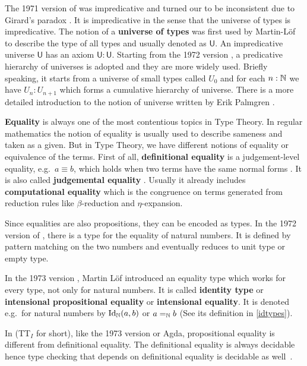 The 1971 version  of \mltt \cite{per:71} was impredicative and turned our to be inconsistent due to Girard's paradox \cite{hurkens1995simplification}. It is impredicative in the sense that the universe of types is impredicative. The notion of a \textbf{universe of types} was first used by Martin-L\"{o}f \cite{Martin-Lof-1973} to describe the type of all types and usually denoted as $\mathsf{U}$. An impredicative universe $\mathsf{U}$ has an axiom $\mathsf{U} : \mathsf{U}$.
Starting from the 1972 version \cite{Martin-Lof-1972}, a predicative hierarchy of universes is adopted and they are more widely used. Briefly speaking, it starts from a universe of small types called $U_0$ and for each $n : \mathbb{N}$ we have $U_n : U_{n+1}$ which forms a cumulative hierarchy of universe. There is a more detailed introduction to the notion of universe written by Erik Palmgren \cite{Palmgren98onuniverses}.


\textbf{Equality} is always one of the most contentious topics in Type Theory.
In regular mathematics the notion of equality is usually used to describe sameness and taken as a given.
But in Type Theory, we have different notions of equality or equivalence of the terms.
First of all, \textbf{definitional equality} is a judgement-level equality, e.g.\  $a \equiv b$, which holds when two terms have the same normal forms \cite{nor:90}. It is also called \textbf{judgemental equality} \cite{martin1984intuitionistic}. Usually it already includes \textbf{computational equality} which is the congruence on terms generated from reduction rules like $\beta$-reduction and $\eta$-expansion. 


Since equalities are also propositions, they can be encoded as types.
In the 1972 version of \mltt, there is a type for the equality of natural numbers. It is defined by pattern matching on the two numbers and eventually reduces to unit type or empty type.

In the 1973 version \cite{Martin-Lof-1973}, Martin L\"{o}f introduced an equality type which works for every type, not only for natural numbers. It is called \textbf{identity type} or \textbf{intensional propositional equality} or \textbf{intensional equality}. It is denoted e.g.\ for natural numbers by $\text{Id}_{\mathbb{N}}(a, b)$ or $a =_{\mathbb{N}} b$ (See its definition in \ref{idtypes}).


In \itt (TT$_I$ for short), like the 1973 version or Agda, propositional equality is different from definitional equality. 
The definitional equality is always decidable hence type checking that depends on definitional equality is
decidable as well~\cite{alti:lics99}.



